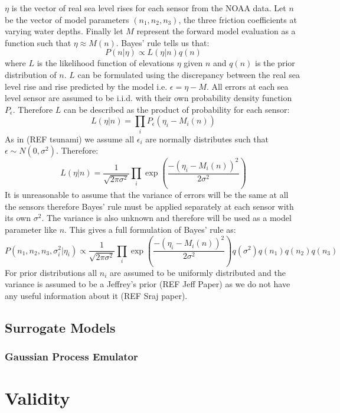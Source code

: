 \documentclass[12pt,a4paper]{article}
\begin{document}
$\eta$ is the vector of real sea level rises for each sensor from the NOAA data. Let $n$ be the vector of model parameters $(n_1,n_2,n_3)$, the three friction coefficients at varying water depths. Finally let $M$ represent the forward model evaluation as a function such that $\eta \approx M(n)$. Bayes' rule tells us that:
\begin{equation}
	P(n|\eta) \propto L(\eta|n)q(n)
\end{equation}
where $L$ is the likelihood function of elevations $\eta$ given $n$ and $q(n)$ is the prior distribution of $n$. $L$ can be formulated using the discrepancy between the real sea level rise and rise predicted by the model i.e. $\epsilon=\eta-M$. All errors at each sea level sensor are assumed to be i.i.d. with their own probability density function $P_\epsilon$. Therefore $L$ can be described as the product of probability for each sensor:
\begin{equation}
	L(\eta|n)=\prod_i P_\epsilon(\eta_i - M_i(n))
\end{equation}
As in (REF tsunami) we assume all $\epsilon_i$ are normally distributes such that $\epsilon\sim N(0,\sigma^2)$. Therefore:
\begin{equation}
	L(\eta|n) = \frac{1}{\sqrt{2\pi\sigma^2}}\prod_i \exp \left(   \frac{-(\eta_i-M_i(n))^2}{2\sigma^2}  \right)
\end{equation}
It is unreasonable to assume that the variance of errors will be the same at all the sensors therefore Bayes' rule must be applied separately at each sensor with its own $\sigma^2$. The variance is also unknown and therefore will be used as a model parameter like $n$. This gives a full formulation of Bayes' rule as:
\begin{equation}
	P(n_1,n_2,n_3,\sigma^2_i|\eta_i)\propto \frac{1}{\sqrt{2\pi\sigma^2}}\prod_i\exp\left(
	\frac{-(\eta_i - M_i(n))^2}{2\sigma^2}
	\right)q(\sigma^2)q(n_1)q(n_2)q(n_3)
\end{equation}
For prior distributions all $n_i$ are assumed to be uniformly distributed and the variance is assumed to be a Jeffrey's prior (REF Jeff Paper) as we do not have any useful information about it (REF Sraj paper).
\subsection{Surrogate Models}
\subsubsection{Gaussian Process Emulator}
\noindent

\section{Validity} \label{sec:val}


\end{document}
